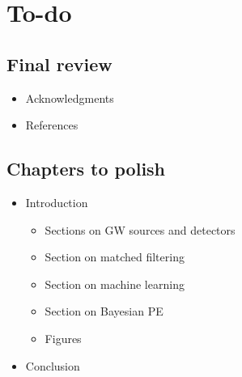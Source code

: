 \chapter{To-do}

\section{Final review}
\begin{itemize}
    \item Acknowledgments
    \item References
\end{itemize}


\section{Chapters to polish}
\begin{itemize}
    \item Introduction
    \begin{itemize}
        \item Sections on GW sources and detectors
        \item Section on matched filtering
        \item Section on machine learning
        \item Section on Bayesian PE
        \item Figures
    \end{itemize}
    \item Conclusion
\end{itemize}